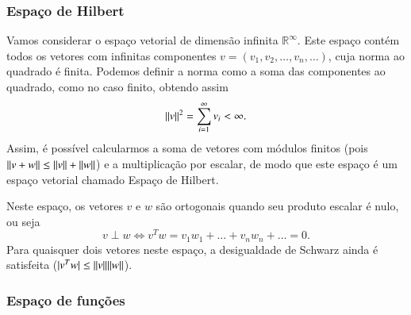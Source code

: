 \subsubsection{Espaço de Hilbert}

Vamos considerar o espaço vetorial de dimensão infinita ${\mathbb{R}}^{\infty}$. Este espaço contém todos os vetores com infinitas componentes $v = (v_1,v_2,\ldots,v_n,\ldots)$, cuja norma ao quadrado é finita. Podemos definir a norma como a soma das componentes ao quadrado, como no caso finito, obtendo assim
\begin{equation*}
   \| v \|^2 = \sum_{i=1}^{\infty} v_i < \infty.
\end{equation*}
Assim, é possível calcularmos a soma de vetores com módulos finitos (pois $\| v+w \| \leq \| v \|+\| w \|$) e a multiplicação por escalar, de modo que este espaço é um espaço vetorial chamado Espaço de Hilbert.

Neste espaço, os vetores $v$ e $w$ são ortogonais quando seu produto escalar é nulo, ou seja
\begin{equation*}
  v\perp w \Leftrightarrow v^Tw = v_1w_1+\ldots+v_nw_n+\ldots=0.
\end{equation*}
Para quaisquer dois vetores neste espaço, a desigualdade de Schwarz ainda é satisfeita ($|v^Tw| \leq \| v \|\| w \|$).

\subsubsection{Espaço de funções}

